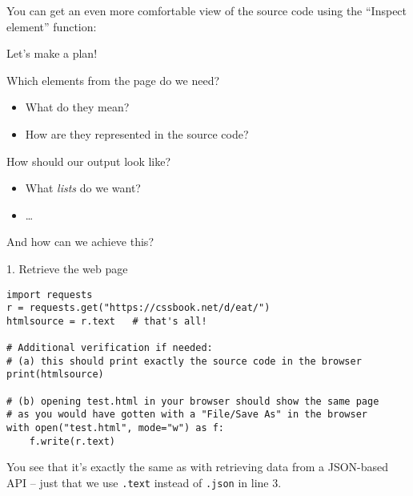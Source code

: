 \begin{frame}[plain]
You can get an even more comfortable view of the source code using the ``Inspect element'' function:

\end{frame}
{
\begin{frame}[plain]
\end{frame}
\begin{frame}[plain]
\end{frame}
}





\begin{frame}{Let's make a plan!}
\begin{block}{Which elements from the page do we need?}
\begin{itemize}
\item What do they mean?
\item How are they represented in the source code?
\end{itemize}
\end{block}
\begin{block}{How should our output look like?}
\begin{itemize}
\item What \emph{lists} do we want?
\item \ldots
\end{itemize}
\end{block}
And how can we achieve this?
\end{frame}




\begin{frame}[fragile]{1. Retrieve the web page}
\begin{verbatim}
import requests
r = requests.get("https://cssbook.net/d/eat/")
htmlsource = r.text   # that's all!

# Additional verification if needed:
# (a) this should print exactly the source code in the browser
print(htmlsource)

# (b) opening test.html in your browser should show the same page
# as you would have gotten with a "File/Save As" in the browser
with open("test.html", mode="w") as f:
    f.write(r.text)
\end{verbatim}
You see that it's exactly the same as with retrieving data from a JSON-based API -- just that we use  \texttt{.text} instead of \texttt{.json} in line 3.
\end{frame}

